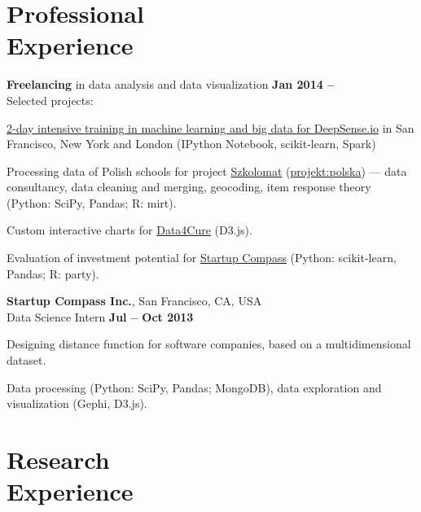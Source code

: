 \documentclass[margin,line]{resume}
\begin{document}
\begin{resume}
\vspace{3mm}

    \section{\mysidestyle Professional\\Experience}

    {\bf  Freelancing} in data analysis and data visualization \hfill {\bf Jan 2014 --}\\
    Selected projects:\\
    \begin{list2}
        \vspace*{-4mm}
        \item \href{http://trainings.deepsense.io/}{2-day intensive training in machine learning and big data for DeepSense.io} in San Francisco, New York and London (IPython Notebook, scikit-learn, Spark)
        \item Processing data of Polish schools for project \href{http://szkolomat.pl/}{Szkolomat} (\href{http://projektpolska.pl/english/about-us/}{projekt:polska}) --- data consultancy, data cleaning and merging, geocoding, item response theory (Python: SciPy, Pandas; R: mirt).
        \item Custom interactive charts for \href{http://www.data4cure.com/}{Data4Cure} (D3.js).
        \item Evaluation of investment potential for \href{https://www.compass.co/}{Startup Compass} (Python: scikit-learn, Pandas; R: party).
    \end{list2}

    {\bf  Startup Compass Inc.}, San Francisco, CA, USA\\
    Data Science Intern \hfill {\bf Jul -- Oct 2013}\\
    \begin{list2}
        \vspace*{-4mm}
        \item Designing distance function for software companies, based on a multidimensional dataset.
        \item Data processing (Python: SciPy, Pandas; MongoDB), data exploration and visualization (Gephi, D3.js).
    \end{list2}


\newpage

    \section{\mysidestyle Research\\Experience}


\end{resume}
\end{document}

